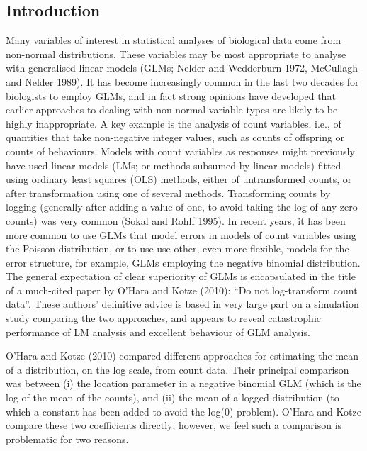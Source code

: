 \documentclass[]{article}
\begin{document}
\clearpage

\subsection{Introduction}\label{introduction}

Many variables of interest in statistical analyses of biological data
come from non-normal distributions. These variables may be most
appropriate to analyse with generalised linear models (GLMs; Nelder and
Wedderburn 1972, McCullagh and Nelder 1989). It has become increasingly
common in the last two decades for biologists to employ GLMs, and in
fact strong opinions have developed that earlier approaches to dealing
with non-normal variable types are likely to be highly inappropriate. A
key example is the analysis of count variables, i.e., of quantities that
take non-negative integer values, such as counts of offspring or counts
of behaviours. Models with count variables as responses might previously
have used linear models (LMs; or methods subsumed by linear models)
fitted using ordinary least squares (OLS) methods, either of
untransformed counts, or after transformation using one of several
methods. Transforming counts by logging (generally after adding a value
of one, to avoid taking the log of any zero counts) was very common
(Sokal and Rohlf 1995). In recent years, it has been more common to use
GLMs that model errors in models of count variables using the Poisson
distribution, or to use use other, even more flexible, models for the
error structure, for example, GLMs employing the negative binomial
distribution. The general expectation of clear superiority of GLMs is
encapsulated in the title of a much-cited paper by O'Hara and Kotze
(2010): ``Do not log-transform count data''. These authors' definitive
advice is based in very large part on a simulation study comparing the
two approaches, and appears to reveal catastrophic performance of LM
analysis and excellent behaviour of GLM analysis.

O'Hara and Kotze (2010) compared different approaches for estimating the
mean of a distribution, on the log scale, from count data. Their
principal comparison was between (i) the location parameter in a
negative binomial GLM (which is the log of the mean of the counts), and
(ii) the mean of a logged distribution (to which a constant has been
added to avoid the log(0) problem). O'Hara and Kotze compare these two
coefficients directly; however, we feel such a comparison is problematic
for two reasons.
\end{document}
